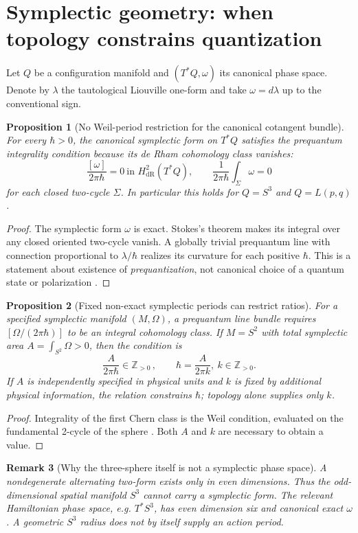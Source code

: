 \documentclass[11pt,a4paper]{article}
\newtheorem{proposition}{Proposition}[section]
\newtheorem{remark}[proposition]{Remark}
\newcommand{\h}{\hbar}
\newcommand{\Z}{\mathbb Z}
\begin{document}
\section{Symplectic geometry: when topology constrains quantization}
Let $Q$ be a configuration manifold and $(T^*Q,\omega)$ its canonical phase space. Denote by $\lambda$ the tautological Liouville one-form and take $\omega=d\lambda$ up to the conventional sign.
\begin{proposition}[No Weil-period restriction for the canonical cotangent bundle]\label{pr:cotangent}
For every $\h>0$, the canonical symplectic form on $T^*Q$ satisfies the prequantum integrality condition because its de Rham cohomology class vanishes:
\begin{equation}\label{eq:exact}
 \frac{[\omega]}{2\pi\h}=0\ \text{in }H^2_{\mathrm{dR}}(T^*Q), \qquad
 \frac{1}{2\pi\h}\int_\Sigma\omega=0
\end{equation}
for each closed two-cycle $\Sigma$. In particular this holds for $Q=S^3$ and $Q=L(p,q)$.
\end{proposition}
\begin{proof} The symplectic form $\omega$ is exact. Stokes's theorem makes its integral over any closed oriented two-cycle vanish. A globally trivial prequantum line with connection proportional to $\lambda/\h$ realizes its curvature for each positive $\h$. This is a statement about existence of \emph{prequantization}, not canonical choice of a quantum state or polarization \cite{GeoQuant}.\end{proof}
\begin{proposition}[Fixed non-exact symplectic periods can restrict ratios]\label{pr:weil}
For a \emph{specified} symplectic manifold $(M,\Omega)$, a prequantum line bundle requires $[\Omega/(2\pi\h)]$ to be an integral cohomology class. If $M=S^2$ with total symplectic area $A=\int_{S^2}\Omega>0$, then the condition is
\begin{equation}\label{eq:weil}
 \frac{A}{2\pi\h}\in\Z_{>0}\,,\qquad \h=\frac{A}{2\pi k},\ k\in\Z_{>0}.
\end{equation}
If $A$ is independently specified in physical units and $k$ is fixed by additional physical information, the relation constrains $\h$; topology alone supplies only $k$.
\end{proposition}
\begin{proof} Integrality of the first Chern class is the Weil condition, evaluated on the fundamental 2-cycle of the sphere \cite{GeoQuant}. Both $A$ and $k$ are necessary to obtain a value.\end{proof}
\begin{remark}[Why the three-sphere itself is not a symplectic phase space]
A nondegenerate alternating two-form exists only in even dimensions. Thus the odd-dimensional spatial manifold $S^3$ cannot carry a symplectic form. The relevant Hamiltonian phase space, e.g. $T^*S^3$, has even dimension six and canonical exact $\omega$. A geometric $S^3$ radius does not by itself supply an action period.
\end{remark}
\end{document}
